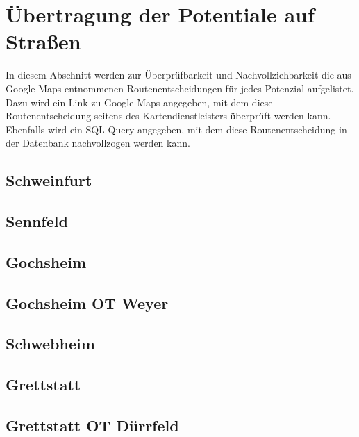 \documentclass[fontsize=12pt,a4paper]{scrreprt}
\begin{document}
        \section{Übertragung der Potentiale auf Straßen}
                In diesem Abschnitt werden zur Überprüfbarkeit und Nachvollziehbarkeit die aus Google Maps entnommenen Routenentscheidungen für jedes Potenzial aufgelistet. Dazu wird ein Link zu Google Maps angegeben, mit dem diese Routenentscheidung seitens des Kartendienstleisters überprüft werden kann. Ebenfalls wird ein SQL-Query angegeben, mit dem diese Routenentscheidung in der Datenbank nachvollzogen werden kann.
                \begin{landscape}
                \subsection{Schweinfurt}
                

                \subsection{Sennfeld}
                
                
                \subsection{Gochsheim}
                
                
                \subsection{Gochsheim OT Weyer}
                
                
                \subsection{Schwebheim}
                
                
                \subsection{Grettstatt}
                
                
                \subsection{Grettstatt OT Dürrfeld}
                
                

\end{landscape}
\end{document}
